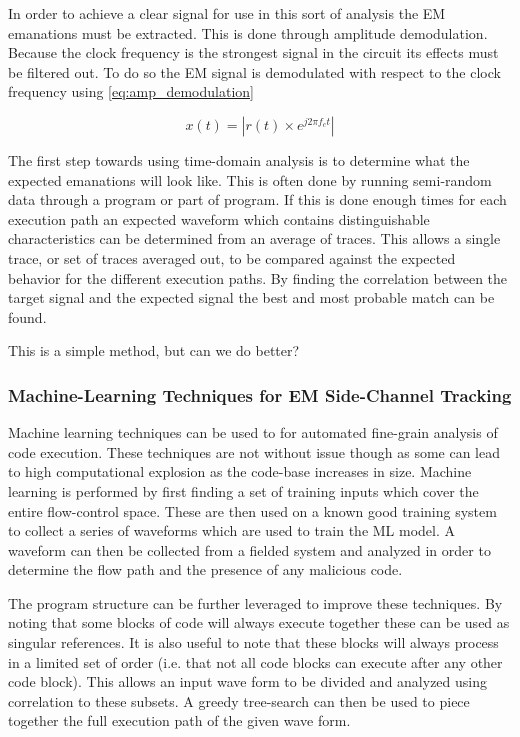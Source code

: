     In order to achieve a clear signal for use in this sort of analysis the EM emanations must be extracted.
    This is done through amplitude demodulation.
    Because the clock frequency is the strongest signal in the circuit its effects must be filtered out.
    To do so the EM signal is demodulated with respect to the clock frequency using \autoref{eq:amp_demodulation}

    \begin{equation}
      \label{eq:amp_demodulation}
      x(t) = | r(t) \times e^{j2\pi f_c t} |
    \end{equation}

    The first step towards using time-domain analysis is to determine what the expected emanations will look like.
    This is often done by running semi-random data through a program or part of program.
    If this is done enough times for each execution path an expected waveform which contains distinguishable 
      characteristics can be determined from an average of traces.
    This allows a single trace, or set of traces averaged out, to be compared against the expected behavior for the different
      execution paths.
    By finding the correlation between the target signal and the expected signal the best and most probable match can be found.

    This is a simple method, but can we do better?

    \subsubsection{Machine-Learning Techniques for EM Side-Channel Tracking}
      Machine learning techniques can be used to for automated fine-grain analysis of code execution.
      These techniques are not without issue though as some can lead to high computational explosion as the 
        code-base increases in size.
      Machine learning is performed by first finding a set of training inputs which cover the entire flow-control space.
      These are then used on a known good training system to collect a series of waveforms which are used to 
        train the ML model.
      A waveform can then be collected from a fielded system and analyzed in order to determine the flow 
        path and the presence of any malicious code.

      The program structure can be further leveraged to improve these techniques.
      By noting that some blocks of code will always execute together these can be used as singular references.
      It is also useful to note that these blocks will always process in a limited set of order 
        (i.e. that not all code blocks can execute after any other code block).
      This allows an input wave form to be divided and analyzed using correlation to these subsets.
      A greedy tree-search can then be used to piece together the full execution path of the given wave form.

